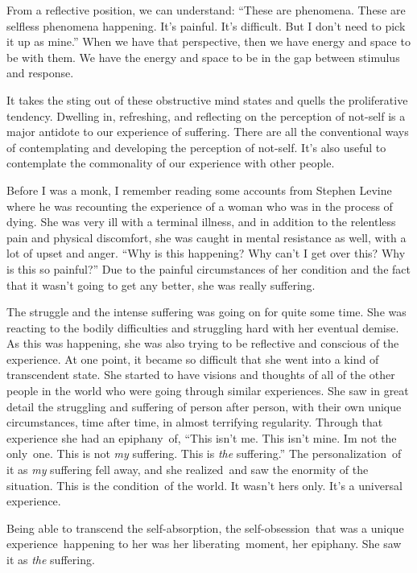 From a reflective position, we can understand: ``These are phenomena. These are selfless phenomena happening. It's painful. It's difficult. But I don't need to pick it up as mine.'' When we have that perspective, then we have energy and space to be with them. We have the energy and space to be in the gap between stimulus and response.

It takes the sting out of these obstructive mind states and quells the proliferative tendency. Dwelling in, refreshing, and reflecting on the perception of not-self is a major antidote to our experience of suffering. There are all the conventional ways of contemplating and developing the perception of not-self. It's also useful to contemplate the commonality of our experience with other people.~

Before I was a monk, I remember reading some accounts from Stephen Levine where he was recounting the experience of a woman who was in the process of dying. She was very ill with a terminal illness, and in addition to the relentless pain and physical discomfort, she was caught in mental resistance as well, with a lot of upset and anger. ``Why is this happening? Why can't I get over this? Why is this so painful?'' Due to the painful circumstances of her condition and the fact that it wasn't going to get any better, she was really suffering.

The struggle and the intense suffering was going on for quite some time. She was reacting to the bodily difficulties and struggling hard with her eventual demise. As this was happening, she was also trying to be reflective and conscious of the experience. At one point, it became so difficult that she went into a kind of transcendent state. She started to have visions and thoughts of all of the other people in the world who were going through similar experiences. She saw in great detail the struggling and suffering of person after person, with their own unique circumstances, time after time, in almost terrifying regularity. Through that experience she had an epiphany~of, ``This isn't me. This isn't mine. I\textquotesingle m not the only~one. This is not \emph{my} suffering. This is \emph{the} suffering.'' The personalization~of it as \emph{my} suffering fell away, and she realized~and saw the enormity of the situation. This is the condition~of the world. It wasn't hers only. It's a universal experience.

Being able to transcend the self-absorption, the self-obsession~that was a unique experience~happening to her was her liberating~moment, her epiphany. She saw it as \emph{the} suffering.~


